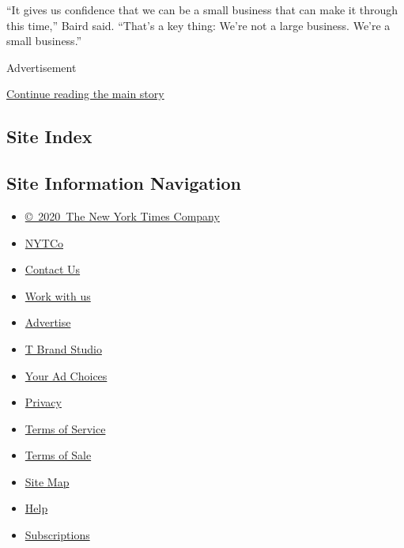 ``It gives us confidence that we can be a small business that can make
it through this time,'' Baird said. ``That's a key thing: We're not a
large business. We're a small business.''

Advertisement

\protect\hyperlink{after-bottom}{Continue reading the main story}

\hypertarget{site-index}{%
\subsection{Site Index}\label{site-index}}

\hypertarget{site-information-navigation}{%
\subsection{Site Information
Navigation}\label{site-information-navigation}}

\begin{itemize}
\tightlist
\item
  \href{https://help.nytimes3xbfgragh.onion/hc/en-us/articles/115014792127-Copyright-notice}{©~2020~The
  New York Times Company}
\end{itemize}

\begin{itemize}
\tightlist
\item
  \href{https://www.nytco.com/}{NYTCo}
\item
  \href{https://help.nytimes3xbfgragh.onion/hc/en-us/articles/115015385887-Contact-Us}{Contact
  Us}
\item
  \href{https://www.nytco.com/careers/}{Work with us}
\item
  \href{https://nytmediakit.com/}{Advertise}
\item
  \href{http://www.tbrandstudio.com/}{T Brand Studio}
\item
  \href{https://www.nytimes3xbfgragh.onion/privacy/cookie-policy\#how-do-i-manage-trackers}{Your
  Ad Choices}
\item
  \href{https://www.nytimes3xbfgragh.onion/privacy}{Privacy}
\item
  \href{https://help.nytimes3xbfgragh.onion/hc/en-us/articles/115014893428-Terms-of-service}{Terms
  of Service}
\item
  \href{https://help.nytimes3xbfgragh.onion/hc/en-us/articles/115014893968-Terms-of-sale}{Terms
  of Sale}
\item
  \href{https://spiderbites.nytimes3xbfgragh.onion}{Site Map}
\item
  \href{https://help.nytimes3xbfgragh.onion/hc/en-us}{Help}
\item
  \href{https://www.nytimes3xbfgragh.onion/subscription?campaignId=37WXW}{Subscriptions}
\end{itemize}
